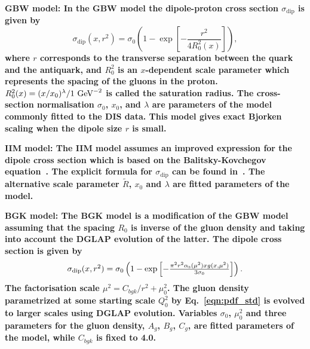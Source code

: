 \begin{description}
\item \bf {GBW model:} \rm
In the GBW model the dipole-proton cross section $\sigma_{\text{dip}}$ is given by
\begin{equation}
\label{eGBW}
   \sigma_{\text{dip}}(x,r^{2}) = \sigma_{0} \left(1 - \exp \left[-\frac{r^{2}}{4R_{0}^{2}(x)} \right]\right),
\end{equation}
where $r$ corresponds to the transverse separation between the quark and the antiquark, and $R_{0}^{2}$
 is 
an $x$-dependent scale parameter which represents the spacing of the gluons in the proton. 
$R_0^2(x) = (x/x_0)^\lambda/1\,{\rm \,\text{Ge\hspace{-.08em}V}}^{-2}$ is called the saturation radius.
The cross-section normalisation $\sigma_0$, $x_0$, and $\lambda$ are parameters 
of the model commonly fitted to the DIS data.
This model gives exact Bjorken scaling when the dipole size $r$ is small.

\vspace{0.1cm}
\item \bf {IIM model:} \rm
The IIM model assumes an improved expression for the dipole cross section which is based on the 
Balitsky-Kovchegov equation~\cite{Balitsky:1995ub}. The explicit formula for $\sigma_{\text{dip}}$ 
can be found in~\cite{Iancu:2003ge}. 
The alternative scale parameter $\tilde{R}$, $x_{0}$ and $\lambda$ are fitted parameters of the model.

\vspace{0.1cm}
\item \bf {BGK model:} \rm
The BGK model is a modification of the GBW model assuming that the
spacing $R_0$ is inverse of the gluon density and taking
into account the DGLAP evolution of the latter.
The dipole cross section is given by
\begin{equation}
\begin{array}{lcl}
   \sigma_{\text{dip}}(x,r^{2})  =  \sigma_{0} 
\left(1 - \exp \left[-\frac{\pi^{2} r^{2} \alpha_\mathrm{s} (\mu^{2}) xg(x,\mu^{2})}{3 \sigma_{0}} \right]\right).
\end{array}
\label{eBGK}
\end{equation}
The factorisation scale $\mu^{2} = C_{bgk}/r^{2}+\mu^{2}_{0}$.
The gluon density parametrized at some starting scale $Q_{0}^{2}$ by Eq.~\ref{eqn:pdf_std}
is evolved to larger scales using DGLAP evolution.
Variables $\sigma_{0}$, $\mu^{2}_{0}$ and three parameters for the gluon density, $A_{g}$, $B_{g}$, $C_{g}$,
are fitted parameters of the model, while $C_{bgk}$ is fixed to 4.0.


\end{description}
